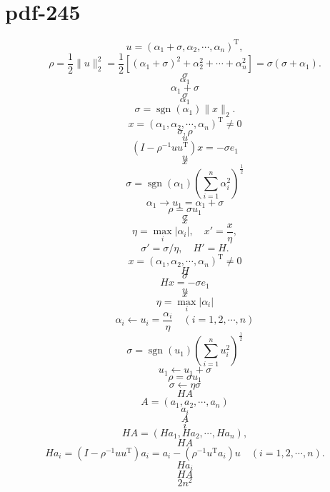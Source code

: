 \documentclass[fontset=fandol]{ctexart}
\begin{document}
\section*{pdf-245}
\[
u=(\alpha_1+\sigma,\alpha_2,\cdots,\alpha_n)^{\mathrm T},
\]
\[
\rho=\frac12\|u\|_2^2=\frac12\left[(\alpha_1+\sigma)^2+\alpha_2^2+\cdots+\alpha_n^2\right]=\sigma(\sigma+\alpha_1).
\]
\[
\sigma
\]
\[
\alpha_1
\]
\[
\alpha_1+\sigma
\]
\[
\sigma
\]
\[
\alpha_1
\]
\[
\sigma=\operatorname{sgn}(\alpha_1)\|x\|_2.
\]
\[
x=(\alpha_1,\alpha_2,\cdots,\alpha_n)^{\mathrm T}\ne0
\]
\[
\sigma,\rho
\]
\[
u
\]
\[
(I-\rho^{-1}uu^{\mathrm T})x=-\sigma e_1
\]
\[
u
\]
\[
x
\]
\[
\sigma=\operatorname{sgn}(\alpha_1)\left(\displaystyle\sum_{i=1}^n\alpha_i^2\right)^{\frac12}
\]
\[
\alpha_1\to u_1=\alpha_1+\sigma
\]
\[
\rho=\sigma u_1
\]
\[
\sigma
\]
\[
x
\]
\[
\eta=\max_i|\alpha_i|,\quad x'=\frac{x}{\eta},
\]
\[
\sigma'=\sigma/\eta,\quad H'=H.
\]
\[
x=(\alpha_1,\alpha_2,\cdots,\alpha_n)^{\mathrm T}\ne0
\]
\[
H
\]
\[
\sigma
\]
\[
Hx=-\sigma e_1
\]
\[
u
\]
\[
x
\]
\[
\eta=\max_i|\alpha_i|
\]
\[
\alpha_i\leftarrow u_i=\dfrac{\alpha_i}{\eta}\quad(i=1,2,\cdots,n)
\]
\[
\sigma=\operatorname{sgn}(u_1)\left(\displaystyle\sum_{i=1}^nu_i^2\right)^{\frac12}
\]
\[
u_1\leftarrow u_1+\sigma
\]
\[
\rho=\sigma u_1
\]
\[
\sigma\leftarrow\eta\sigma
\]
\[
HA
\]
\[
A=(a_1,a_2,\cdots,a_n)
\]
\[
a_i
\]
\[
A
\]
\[
i
\]
\[
HA=(Ha_1,Ha_2,\cdots,Ha_n),
\]
\[
HA
\]
\[
Ha_i=(I-\rho^{-1}uu^{\mathrm T})a_i=a_i-(\rho^{-1}u^{\mathrm T}a_i)u\quad(i=1,2,\cdots,n).
\]
\[
Ha_i
\]
\[
HA
\]
\[
2n^2
\]
\end{document}
